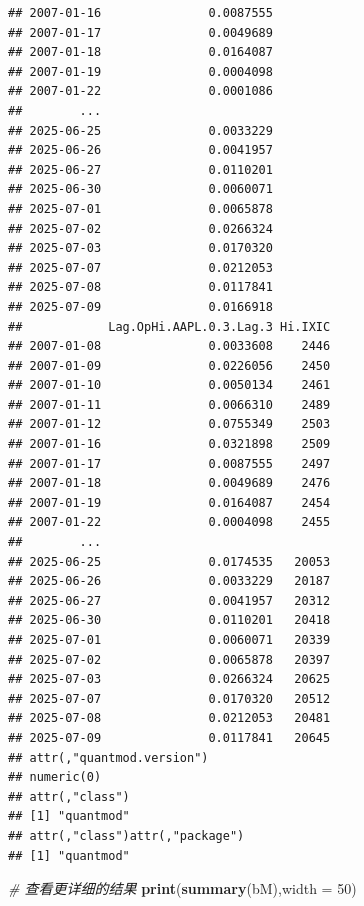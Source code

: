 \documentclass[]{ctexbook}
\newenvironment{Shaded}{\begin{snugshade}}{\end{snugshade}}
\newcommand{\AttributeTok}[1]{\textcolor[rgb]{0.13,0.29,0.53}{#1}}
\newcommand{\CommentTok}[1]{\textcolor[rgb]{0.56,0.35,0.01}{\textit{#1}}}
\newcommand{\DecValTok}[1]{\textcolor[rgb]{0.00,0.00,0.81}{#1}}
\newcommand{\FunctionTok}[1]{\textcolor[rgb]{0.13,0.29,0.53}{\textbf{#1}}}
\newcommand{\NormalTok}[1]{#1}
\begin{document}
\begin{verbatim}
## 2007-01-16               0.0087555
## 2007-01-17               0.0049689
## 2007-01-18               0.0164087
## 2007-01-19               0.0004098
## 2007-01-22               0.0001086
##        ...                        
## 2025-06-25               0.0033229
## 2025-06-26               0.0041957
## 2025-06-27               0.0110201
## 2025-06-30               0.0060071
## 2025-07-01               0.0065878
## 2025-07-02               0.0266324
## 2025-07-03               0.0170320
## 2025-07-07               0.0212053
## 2025-07-08               0.0117841
## 2025-07-09               0.0166918
##            Lag.OpHi.AAPL.0.3.Lag.3 Hi.IXIC
## 2007-01-08               0.0033608    2446
## 2007-01-09               0.0226056    2450
## 2007-01-10               0.0050134    2461
## 2007-01-11               0.0066310    2489
## 2007-01-12               0.0755349    2503
## 2007-01-16               0.0321898    2509
## 2007-01-17               0.0087555    2497
## 2007-01-18               0.0049689    2476
## 2007-01-19               0.0164087    2454
## 2007-01-22               0.0004098    2455
##        ...                                
## 2025-06-25               0.0174535   20053
## 2025-06-26               0.0033229   20187
## 2025-06-27               0.0041957   20312
## 2025-06-30               0.0110201   20418
## 2025-07-01               0.0060071   20339
## 2025-07-02               0.0065878   20397
## 2025-07-03               0.0266324   20625
## 2025-07-07               0.0170320   20512
## 2025-07-08               0.0212053   20481
## 2025-07-09               0.0117841   20645
## attr(,"quantmod.version")
## numeric(0)
## attr(,"class")
## [1] "quantmod"
## attr(,"class")attr(,"package")
## [1] "quantmod"
\end{verbatim}

\begin{Shaded}
\begin{Highlighting}[]
\CommentTok{\# 查看更详细的结果}
\FunctionTok{print}\NormalTok{(}\FunctionTok{summary}\NormalTok{(bM),}\AttributeTok{width =} \DecValTok{50}\NormalTok{)}
\end{Highlighting}
\end{Shaded}
\end{document}
